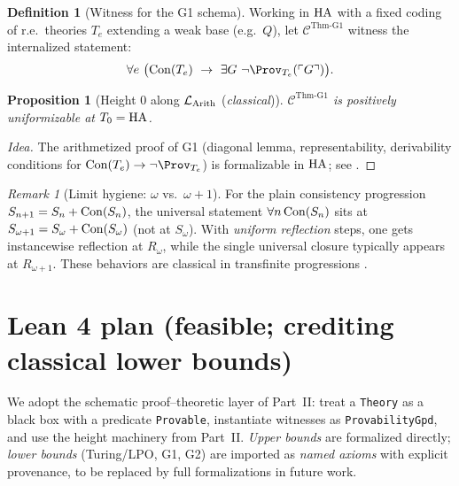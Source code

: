 \documentclass[11pt]{article}
\newtheorem{proposition}[theorem]{Proposition}
\theoremstyle{definition}
\newtheorem{definition}[theorem]{Definition}
\theoremstyle{remark}
\newtheorem{remark}[theorem]{Remark}
\begin{document}
\begin{definition}[Witness for the G1 schema]
Working in \(\mathrm{HA}\) with a fixed coding of r.e.\ theories \(T_e\) extending a weak base (e.g.\ \(Q\)),
let \(\mathcal C^{\mathrm{Thm\mbox{-}G1}}\) witness the internalized statement:
\[
\forall e\ \big(\Con(T_e)\ \to\ \exists G\ \neg \Prov_{T_e}(\ulcorner G\urcorner)\big).
\]
\end{definition}

\begin{proposition}[Height \(0\) along \(\mathcal{L}_{\mathrm{Arith}}\) (\emph{classical})]\label{III:prop:G1-schema-height0}
\(\mathcal C^{\mathrm{Thm\mbox{-}G1}}\) is positively uniformizable at \(T_0=\mathrm{HA}\).
\end{proposition}

\begin{proof}[Idea]
The arithmetized proof of G1 (diagonal lemma, representability, derivability conditions for
\(\Con(T_e)\to \neg \Prov_{T_e}\)) is formalizable in \(\mathrm{HA}\); see \cite{HajekPudlak}.
\end{proof}

\begin{remark}[Limit hygiene: \(\omega\) vs.\ \(\omega{+}1\)]
For the plain consistency progression \(S_{n+1}=S_n+\mathrm{Con}(S_n)\), the universal statement
\(\forall n\,\mathrm{Con}(S_n)\) sits at \(S_{\omega+1}=S_\omega+\mathrm{Con}(S_\omega)\) (not at \(S_\omega\)).
With \emph{uniform reflection} steps, one gets instancewise reflection at \(R_\omega\),
while the single universal closure typically appears at \(R_{\omega+1}\).
These behaviors are classical in transfinite progressions \cite{Feferman1962}.
\end{remark}

\section{Lean 4 plan (feasible; crediting classical lower bounds)}

We adopt the schematic proof--theoretic layer of Part~II: treat a \texttt{Theory}
as a black box with a predicate \texttt{Provable}, instantiate witnesses as
\texttt{ProvabilityGpd}, and use the height machinery from Part~II.
\emph{Upper bounds} are formalized directly; \emph{lower bounds} (Turing/LPO, G1, G2)
are imported as \emph{named axioms} with explicit provenance, to be replaced by full
formalizations in future work.
\end{document}
